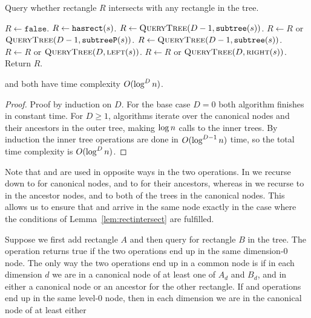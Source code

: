 \documentclass[english,gradu]{tktltiki2018}
\begin{document}
\begin{alg}\label{alg:rectcheck}
Query whether rectangle $R$ intersects with any rectangle in the tree.
\begin{algorithmic}
	\State $R\gets\texttt{false}$.
		\State $R\gets\texttt{hasrect}(s)$.
		\State $R\gets \textsc{QueryTree}(D-1,\texttt{subtree}(s))$.
		\State $R\gets R$ or $\textsc{QueryTree}(D-1,\texttt{subtreeP}(s))$.
		\State $R\gets \textsc{QueryTree}(D-1,\texttt{subtree}(s))$.
		\State $R\gets R$ or $\textsc{QueryTree}(D,\textsc{left}(s))$.
		\State $R\gets R$ or $\textsc{QueryTree}(D,\textsc{right}(s))$.
	\EndIf
	\State Return $R$.
\EndProcedure
\end{algorithmic}
\end{alg}

\begin{lem}\adddt and \checkdt both have time complexity $O(\log^Dn)$.\end{lem}
\begin{proof}
Proof by induction on $D$.
For the base case $D=0$ both algorithm finishes in constant time.
For $D\ge 1$, algorithms iterate over the canonical nodes and their ancestors in the outer tree, making $\log n$ calls to the inner trees.
By induction the inner tree operations are done in $O(\log^{D-1}n)$ time, so the total time complexity is $O(\log^Dn)$.
\end{proof}

Note that \subtree{} and \subtreep{} are used in opposite ways in the two operations.
In \adddt{} we recurse down to \subtree{} for canonical nodes, and to \subtreep{} for their ancestors, whereas in \checkdt{} we recurse to \subtree{} in the ancestor nodes, and to both of the trees in the canonical nodes.
This allows us to ensure that \adddt{} and \checkdt{} arrive in the same node exactly in the case where the conditions of Lemma~\ref{lem:rectintersect} are fulfilled.

Suppose we first add rectangle $A$ and then query for rectangle $B$ in the tree.
The \checkdt operation returns true if the two operations end up in the same dimension-0 node.
The only way the two operations end up in a common node is if in each dimension $d$ we are in a canonical node of at least one of $A_d$ and $B_d$, and in either a canonical node or an ancestor for the other rectangle.
If \adddt{} and \checkdt{} operations end up in the same level-0 node, then in each dimension we are in the canonical node of at least either
\end{document}
